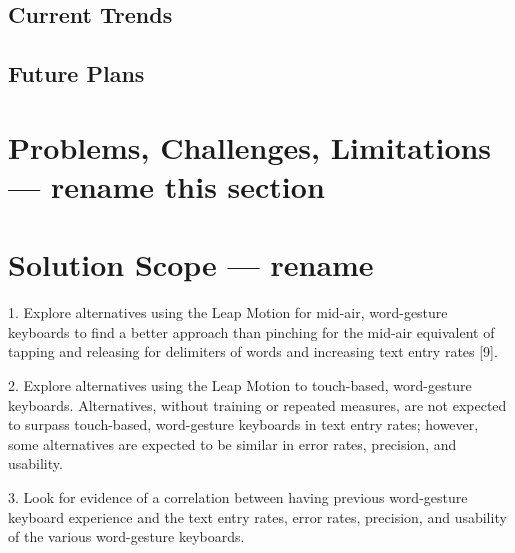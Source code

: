 \subsection{Current Trends}

\subsection{Future Plans}

\section{Problems, Challenges, Limitations --- rename this section}

\section{Solution Scope --- rename}

1.	Explore alternatives using the Leap Motion for mid-air, word-gesture keyboards to find a better approach than pinching for the mid-air equivalent of tapping and releasing for delimiters of words and increasing text entry rates [9].

2.	Explore alternatives using the Leap Motion to touch-based, word-gesture keyboards. Alternatives, without training or repeated measures, are not expected to surpass touch-based, word-gesture keyboards in text entry rates; however, some alternatives are expected to be similar in error rates, precision, and usability.

3.	Look for evidence of a correlation between having previous word-gesture keyboard experience and the text entry rates, error rates, precision, and usability of the various word-gesture keyboards.
